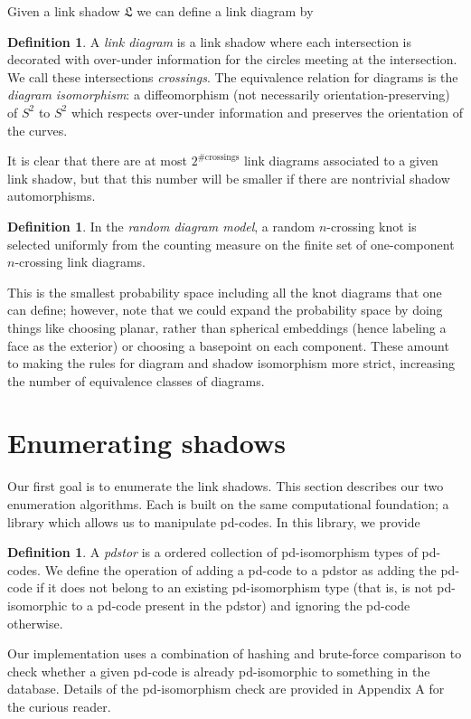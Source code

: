 \documentclass[amsmath,secnumarabic,floatfix,amssymb,nofootinbib,nobibnotes,letterpaper,11pt,tightenlines,showkeys]{revtex4}
\theoremstyle{definition}
\newtheorem{definition}[theorem]{Definition}
\let\mgp=\marginpar \marginparwidth18mm \marginparsep1mm
\def\marginpar#1{\mgp{\raggedright\tiny #1}}
\let\lbl=\label
\def\label#1{\lbl{#1}\ifinner\else\marginpar{\ref{#1} #1}\ignorespaces\fi}
\begin{document}
Given a link shadow $\mathfrak{L}$ we can define a link diagram by
\begin{definition}
A \emph{link diagram} is a link shadow where each intersection is decorated with over-under information for the circles meeting at the intersection. We call these intersections \emph{crossings}. The equivalence relation for diagrams is the \emph{diagram isomorphism}: a diffeomorphism (not necessarily orientation-preserving) of $S^2$ to $S^2$ which respects over-under information and preserves the orientation of the curves.
\end{definition}
It is clear that there are at most $2^{\text{\# crossings}}$ link diagrams associated to a given link shadow, but that this number will be smaller if there are nontrivial shadow automorphisms.
\begin{definition}
In the \emph{random diagram model}, a random $n$-crossing knot is selected uniformly from the counting measure on the finite set of one-component $n$-crossing link diagrams.
\end{definition}
This is the smallest probability space including all the knot diagrams that one can define; however, note that we could expand the probability space by doing things like choosing planar, rather than spherical embeddings (hence labeling a face as the exterior) or choosing a basepoint on each component. These amount to making the rules for diagram and shadow isomorphism more strict, increasing the number of equivalence classes of diagrams. 

\section{Enumerating shadows}

Our first goal is to enumerate the link shadows. This section describes our two enumeration algorithms. Each is built on the same computational foundation; a library which allows us to manipulate pd-codes. In this library, we provide 
\begin{definition}
A \emph{pdstor} is a ordered collection of pd-isomorphism types of pd-codes. We define the operation of adding a pd-code to a pdstor as adding the pd-code if it does not belong to an existing pd-isomorphism type (that is, is not pd-isomorphic to a pd-code present in the pdstor) and ignoring the pd-code otherwise.
\label{def:pdstor}
\end{definition}
Our implementation uses a combination of hashing and brute-force comparison to check whether a given pd-code is already pd-isomorphic to something in the database. Details of the pd-isomorphism check are provided in Appendix A for the curious reader. 
\end{document}
